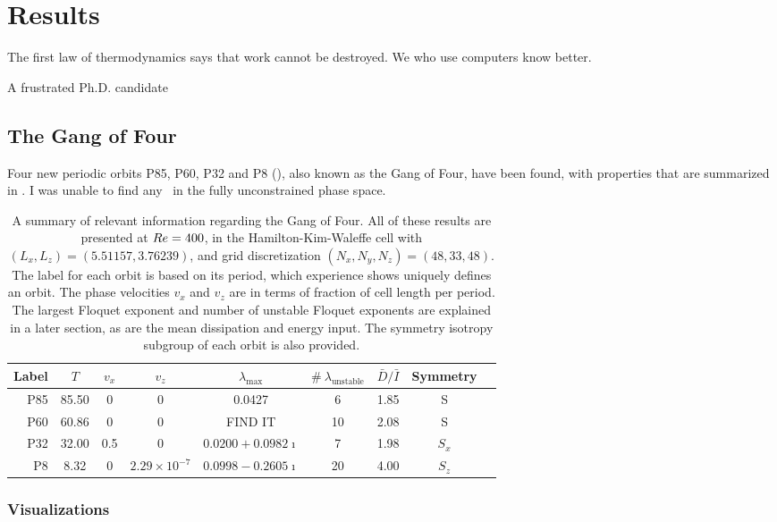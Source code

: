 \chapter{Results}
\epigraph{The first law of thermodynamics says that work cannot be destroyed. We who use computers know better.}{A frustrated Ph.D. candidate}

\section{The Gang of Four}

Four new periodic orbits P85, P60, P32 and P8 (), also known as the Gang of Four, have been found, with properties that are summarized in .  I was unable to find any \ecs\ in the fully unconstrained phase space. 

\begin{table}[h!]
\caption{A summary of relevant information regarding the Gang of Four. All of these results are presented at $Re = 400$, in the Hamilton-Kim-Waleffe cell with $(L_x,L_z) = (5.51157, 3.76239)$, and grid discretization $(N_x,N_y,N_z)= (48,33,48)$. The label for each orbit is based on its period, which experience shows uniquely defines an orbit. The phase velocities $v_x$ and $v_z$ are in terms of fraction of cell length per period. The largest Floquet exponent and number of unstable Floquet exponents are explained in a later section, as are the mean dissipation and energy input. The symmetry isotropy subgroup of each orbit is also provided. }   \label{tab:summary}
\begin{center}
\begin{tabular}{| r |  c | c | c | c | c | c | c | l |}
\toprule
Label & $T$ & $v_x$ & $v_z$ &  $\lambda_{\textrm{max}}$ & $\#\ \lambda_{\textrm{unstable}}$ & $\bar{D}/\bar{I}$&  Symmetry \\
\midrule
P85 & 85.50 & 0 & 0 & 0.0427 & 6 &1.85 & S\\
\midrule
P60 & 60.86 & 0 & 0 & FIND IT&10 & 2.08 & S\\
\midrule
P32 & 32.00 & 0.5 & 0 &  $0.0200 + 0.0982\imath$ & 7& 1.98 &$S_x$\\
\midrule
P8 & 8.32 & 0 & $2.29\times 10^{-7}$ & $0.0998 - 0.2605 \imath$ &20& 4.00& $S_z$\\
\bottomrule
\end{tabular}
\end{center}
\end{table}
\subsection{Visualizations}   

